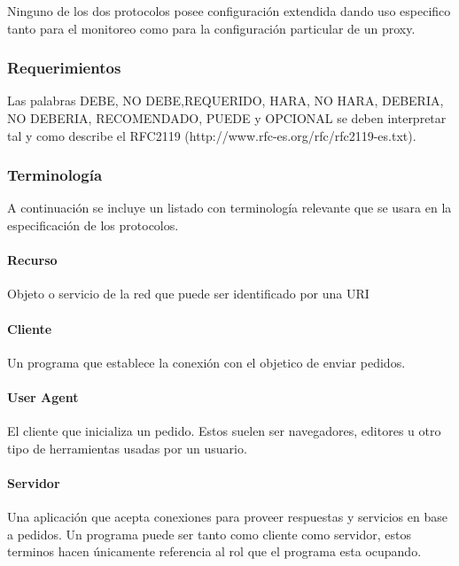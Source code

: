 \documentclass[a4paper,10pt]{article}
\begin{document}
        Ninguno de los dos protocolos posee configuración extendida dando uso especifico tanto para el monitoreo 
        como para la configuración particular de un proxy.

        \subsubsection{Requerimientos}

        Las palabras DEBE, NO DEBE,REQUERIDO, HARA, NO HARA, DEBERIA, NO DEBERIA, 
        RECOMENDADO, PUEDE y OPCIONAL se deben interpretar tal y como describe el 
        RFC2119 (http://www.rfc-es.org/rfc/rfc2119-es.txt).

        \subsubsection{Terminolog\'ia}

        A continuación se incluye un listado con terminolog\'ia relevante que se usara en la 
        especificaci\'on de los protocolos.

            \paragraph*{Recurso}

            Objeto o servicio de la red que puede ser identificado por una URI

            \paragraph*{Cliente}

            Un programa que establece la conexi\'on con el objetico de enviar pedidos.

            \paragraph*{User Agent}

            El cliente que inicializa un pedido. Estos suelen ser navegadores, editores u otro 
            tipo de herramientas usadas por un usuario.

            \paragraph*{Servidor}

            Una aplicaci\'on que acepta conexiones para proveer respuestas y servicios en base 
            a pedidos. Un programa puede ser tanto como cliente como servidor, estos terminos 
            hacen \'unicamente referencia al rol que el programa esta ocupando.
\end{document}
